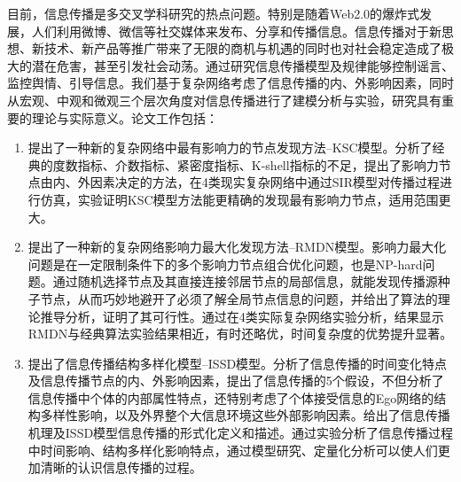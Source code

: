 
 

\makeatletter
\ifthu@bachelor\relax\else
  \ifthu@doctor
  \else
    \ifthu@master
    \fi
  \fi
\fi
\makeatother






\begin{cabstract}
	目前，信息传播是多交叉学科研究的热点问题。特别是随着Web2.0的爆炸式发展，人们利用微博、微信等社交媒体来发布、分享和传播信息。信息传播对于新思想、新技术、新产品等推广带来了无限的商机与机遇的同时也对社会稳定造成了极大的潜在危害，甚至引发社会动荡。通过研究信息传播模型及规律能够控制谣言、监控舆情、引导信息。我们基于复杂网络考虑了信息传播的内、外影响因素，同时从宏观、中观和微观三个层次角度对信息传播进行了建模分析与实验，研究具有重要的理论与实际意义。论文工作包括：
	\begin{enumerate}[(1)]
		\item 提出了一种新的复杂网络中最有影响力的节点发现方法--KSC模型。分析了经典的度数指标、介数指标、紧密度指标、K-shell指标的不足，提出了影响力节点由内、外因素决定的方法，在4类现实复杂网络中通过SIR模型对传播过程进行仿真，实验证明KSC模型方法能更精确的发现最有影响力节点，适用范围更大。
		\item 提出了一种新的复杂网络影响力最大化发现方法--RMDN模型。影响力最大化问题是在一定限制条件下的多个影响力节点组合优化问题，也是NP-hard问题。通过随机选择节点及其直接连接邻居节点的局部信息，就能发现传播源种子节点，从而巧妙地避开了必须了解全局节点信息的问题，并给出了算法的理论推导分析，证明了其可行性。通过在4类实际复杂网络实验分析，结果显示RMDN与经典算法实验结果相近，有时还略优，时间复杂度的优势提升显著。
		\item 提出了信息传播结构多样化模型--ISSD模型。分析了信息传播的时间变化特点及信息传播节点的内、外影响因素，提出了信息传播的5个假设，不但分析了信息传播中个体的内部属性特点，还特别考虑了个体接受信息的Ego网络的结构多样性影响，以及外界整个大信息环境这些外部影响因素。给出了信息传播机理及ISSD模型信息传播的形式化定义和描述。通过实验分析了信息传播过程中时间影响、结构多样化影响特点，通过模型研究、定量化分析可以使人们更加清晰的认识信息传播的过程。
	\end{enumerate}
	
\end{cabstract}

